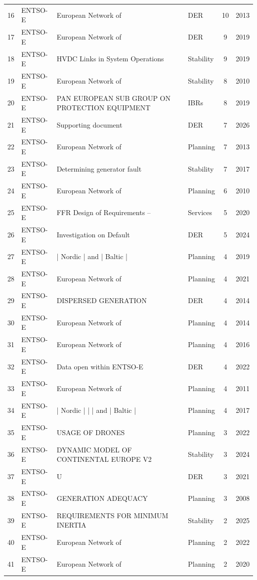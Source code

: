 {\begin{longtable}{c l p{5.5cm} l c c}
16 & ENTSO-E & European Network of & DER & 10 & 2013 \\
17 & ENTSO-E & European Network of & DER & 9 & 2019 \\
18 & ENTSO-E & HVDC Links in System Operations & Stability & 9 & 2019 \\
19 & ENTSO-E & European Network of & Stability & 8 & 2010 \\
20 & ENTSO-E & PAN EUROPEAN SUB GROUP ON PROTECTION EQUIPMENT & IBRs & 8 & 2019 \\
21 & ENTSO-E & Supporting document & DER & 7 & 2026 \\
22 & ENTSO-E & European Network of & Planning & 7 & 2013 \\
23 & ENTSO-E & Determining generator fault & Stability & 7 & 2017 \\
24 & ENTSO-E & European Network of & Planning & 6 & 2010 \\
25 & ENTSO-E & FFR Design of Requirements – & Services & 5 & 2020 \\
26 & ENTSO-E & Investigation on Default & DER & 5 & 2024 \\
27 & ENTSO-E & | Nordic | and | Baltic | & Planning & 4 & 2019 \\
28 & ENTSO-E & European Network of & Planning & 4 & 2021 \\
29 & ENTSO-E & DISPERSED GENERATION & DER & 4 & 2014 \\
30 & ENTSO-E & European Network of & Planning & 4 & 2014 \\
31 & ENTSO-E & European Network of & Planning & 4 & 2016 \\
32 & ENTSO-E & Data open within ENTSO-E & DER & 4 & 2022 \\
33 & ENTSO-E & European Network of & Planning & 4 & 2011 \\
34 & ENTSO-E & | Nordic |     |             | and | Baltic | & Planning & 4 & 2017 \\
35 & ENTSO-E & USAGE OF DRONES & Planning & 3 & 2022 \\
36 & ENTSO-E & DYNAMIC MODEL OF CONTINENTAL EUROPE V2 & Stability & 3 & 2024 \\
37 & ENTSO-E & U & DER & 3 & 2021 \\
38 & ENTSO-E & GENERATION ADEQUACY & Planning & 3 & 2008 \\
39 & ENTSO-E & REQUIREMENTS FOR MINIMUM INERTIA & Stability & 2 & 2025 \\
40 & ENTSO-E & European Network of & Planning & 2 & 2022 \\
41 & ENTSO-E & European Network of & Planning & 2 & 2020 \\

\end{longtable}}

